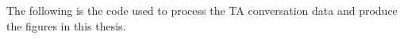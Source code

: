 The following is the code used to process the TA conversation data and produce the figures in this thesis.

\lstset{language=Python}

